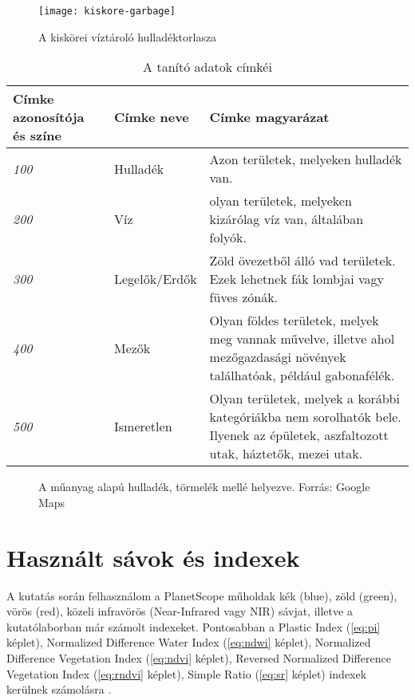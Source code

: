 \begin{figure}[H]
	\centering
	\texttt{[image: kiskore-garbage]}
	\caption{A kiskörei víztároló hulladéktorlasza \cite{petkupa2024}}
    \label{fig:kiskore-waste}
\end{figure}

\begin{table}[H]
	\centering
	\begin{tabular}{ | p{} | p{} | p{} | }
		\hline
		\textbf{Címke azonosítója és színe} & \textbf{Címke neve} & \textbf{Címke magyarázat} \\
		\hline \hline
		\cellcolor{red} \emph{100} & Hulladék & Azon területek, melyeken hulladék van. \\
		\hline
		\cellcolor{blue} \color{white}\emph{200} & Víz & olyan területek, melyeken kizárólag víz van, általában folyók. \\
		\hline
		\cellcolor{green} \emph{300} & Legelők/Erdők & Zöld övezetből álló vad területek. Ezek lehetnek fák lombjai vagy füves zónák. \\
		\hline
    \cellcolor{brown} \emph{400} & Mezők & Olyan földes területek, melyek meg vannak művelve, illetve ahol mezőgazdasági növények találhatóak, például gabonafélék. \\
		\hline
    \cellcolor{gray} \emph{500} & Ismeretlen & Olyan területek, melyek a korábbi kategóriákba nem sorolhatók bele. Ilyenek az épületek, aszfaltozott utak, háztetők, mezei utak. \\
		\hline
	\end{tabular}
	\caption{A tanító adatok címkéi}
	\label{tab:waste-detection-labels}
\end{table}

\begin{figure}[H]
	\centering
	\hspace{5pt}
	\caption{A műanyag alapú hulladék, törmelék mellé helyezve. Forrás: Google Maps}
	\label{fig:waste-vs-debris}
\end{figure}

\section{Használt sávok és indexek}

A kutatás során felhasználom a PlanetScope műholdak kék (blue), zöld (green), vörös (red), közeli infravörös (Near-Infrared vagy NIR) sávjat, illetve a kutatólaborban már számolt indexeket. Pontosabban a Plastic Index (\ref{eq:pi} képlet), Normalized Difference Water Index (\ref{eq:ndwi} képlet), Normalized Difference Vegetation Index (\ref{eq:ndvi} képlet), Reversed Normalized Difference Vegetation Index (\ref{eq:rndvi} képlet), Simple Ratio (\ref{eq:sr} képlet) indexek kerülnek számolásra \cite{Themistocleous2020, magyar2023}.

